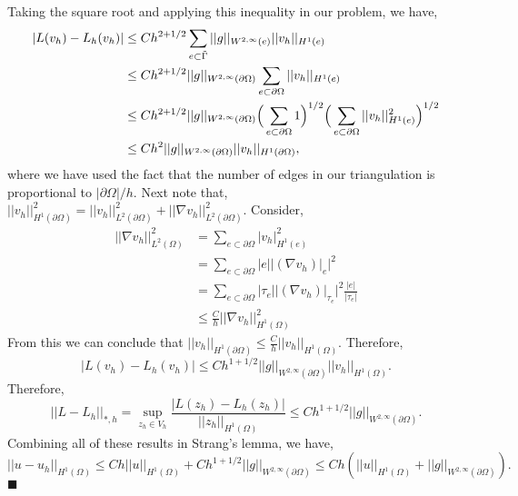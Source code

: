 \documentclass[11pt]{article}
\begin{document}
Taking the square root and applying this inequality in our problem, we have,
\begin{align*}
    |L(v_h) - L_h(v_h)| &\leq C h^{2+1/2} \sum_{e \subset \Tilde{\Gamma}} ||g||_{W^{2,\infty}(e)} ||v_h||_{H^1(e)} \\
	&\leq C h^{2+1/2} ||g||_{W^{2,\infty}(\partial \Omega)} \sum_{e \subset \partial\Omega} ||v_h||_{H^1(e)} \\
	&\leq C h^{2+1/2} ||g||_{W^{2,\infty}(\partial \Omega)} \Big(\sum_{e\subset\partial\Omega} 1\Big)^{1/2} \Big(\sum_{e\subset\partial\Omega} ||v_h||^2_{H^1(e)} \Big)^{1/2} \\
	&\leq C h^2 ||g||_{W^{2,\infty}(\partial \Omega)} ||v_h||_{H^1(\partial\Omega)},
\end{align*}
where we have used the fact that the number of edges in our triangulation is proportional to $|\partial\Omega|/h$.
Next note that, $||v_h||^2_{H^1(\partial\Omega)} = ||v_h||^2_{L^2(\partial\Omega)} + ||\nabla v_h||^2_{L^2(\partial\Omega)}$. 
Consider, 
\begin{align*}
	||\nabla v_h||^2_{L^2(\Omega)} &= \sum_{e\subset\partial\Omega} |v_h|^2_{H^1(e)} \\
	&= \sum_{e\subset\partial\Omega} |e| \big|(\nabla v_h)|_e\big|^2 \\
	&= \sum_{e\subset\partial\Omega} |\tau_e| \big|(\nabla v_h)|_{\tau_e}\big|^2 \frac{|e|}{|\tau_e|} \\
	&\leq \frac{C}{h} ||\nabla v_h||^2_{H^1(\Omega)}
\end{align*}
From this we can conclude that $||v_h||_{H^1(\partial\Omega)} \leq \frac{C}{h} ||v_h||_{H^1(\Omega)}$.
Therefore,
\begin{equation}
	|L(v_h) - L_h(v_h)| \leq C h^{1 + 1/2} ||g||_{W^{2,\infty}(\partial\Omega)} ||v_h||_{H^1(\Omega)}.
\end{equation}
Therefore,
\begin{equation*}
	||L - L_h||_{*,h} = \sup_{z_h \in V_h} \frac{|L(z_h) - L_h(z_h)|}{||z_h||_{H^1(\Omega)}} \leq Ch^{1+1/2} ||g||_{W^{2,\infty}(\partial\Omega)}.
\end{equation*}
Combining all of these results in Strang's lemma, we have,
\begin{equation*}
	||u - u_h||_{H^1(\Omega)} \leq Ch||u||_{H^1(\Omega)} + Ch^{1 + 1/2}||g||_{W^{2,\infty}(\partial\Omega)} \leq Ch(||u||_{H^1(\Omega)} + ||g||_{W^{2,\infty}(\partial\Omega)} ).
\end{equation*}
$\blacksquare$
\end{document}
